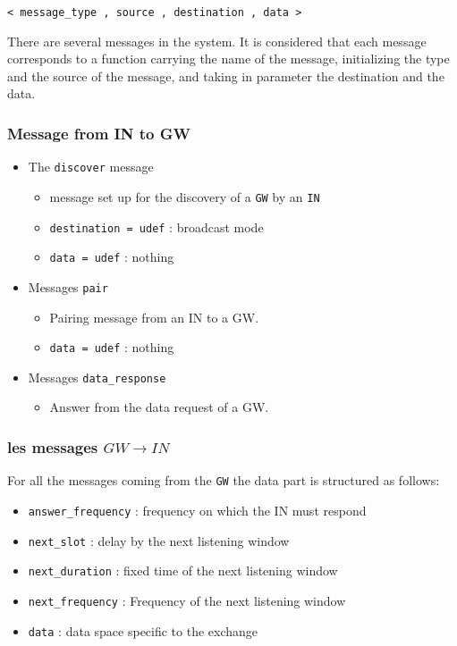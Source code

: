 \documentclass[conference]{IEEEtran}
\begin{document}
\begin{center}
\texttt{< message\_type , source , destination , data >}
\end{center}

There are several messages in the system. It is considered that each message corresponds to a function carrying the name of the message, initializing the type and the source of the message, and taking in parameter the destination and the data.

\subsubsection{Message from IN to GW}
\begin{itemize}
    \item The \texttt{discover} message
    \begin{itemize}
      \item message set up for the discovery of a \texttt{GW} by an \texttt{IN}
      \item \texttt{destination = udef} :  broadcast mode
      \item \texttt{data = udef} : nothing
    \end{itemize}
    \item  Messages \texttt{pair}
    \begin{itemize}
      \item Pairing message from an IN to a GW.
      \item \texttt{data = udef} : nothing
    \end{itemize}
    \item Messages \texttt{data\_response}
    \begin{itemize}
      \item Answer from the data request of a GW.
    \end{itemize}
\end{itemize}

\subsubsection{les messages $GW \rightarrow IN$}
For all the messages coming from the \texttt{GW} the data part is structured as follows:

\begin{itemize}
  \item \texttt{answer\_frequency} : frequency on which the IN must respond
  \item \texttt{next\_slot} : delay by the next listening window
  \item \texttt{next\_duration} : fixed time of the next listening window
  \item \texttt{next\_frequency} : Frequency of the next listening window
  \item \texttt{data} : data space specific to the exchange
\end{itemize}
\end{document}
